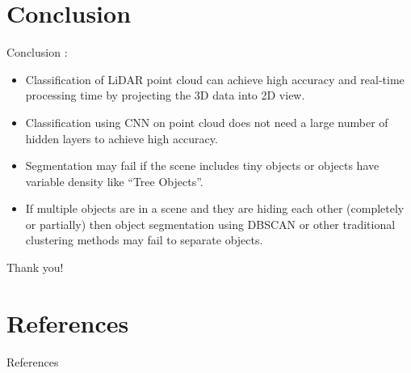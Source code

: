 \documentclass[9pt]{beamer}
\begin{document}

\section{Conclusion}
\begin{frame}[fragile]{Conclusion }
:
\begin{itemize}
	\item Classification of LiDAR point cloud can achieve high accuracy and real-time processing time by projecting the 3D data into 2D view.
	\item Classification using CNN on point cloud does not need a large number of hidden layers to achieve high accuracy.
	\item Segmentation may fail if the scene includes tiny objects or objects have variable density like ``Tree Objects''.
	\item If multiple objects are in a scene and they are hiding each other (completely or partially) then object segmentation using DBSCAN
	or other traditional clustering methods may fail to separate objects.
\end{itemize}
\end{frame}

\appendix
\begin{frame}[fragile]{}

\centering
\Huge
Thank you!

\end{frame}

\section{References}
\begin{frame}[allowframebreaks]{References}

	
	

\end{frame}
\end{document}
